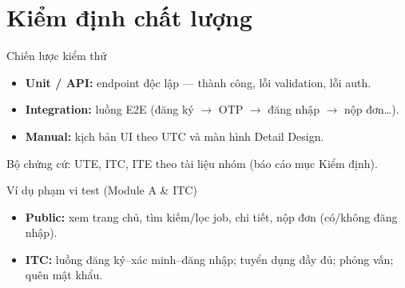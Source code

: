 \section{Kiểm định chất lượng}
\begin{frame}{Chiến lược kiểm thử}
  \small
  \begin{itemize}
    \item \textbf{Unit / API:} endpoint độc lập --- thành công, lỗi validation, lỗi auth.
    \item \textbf{Integration:} luồng E2E (đăng ký $\rightarrow$ OTP $\rightarrow$ đăng nhập $\rightarrow$ nộp đơn\dots).
    \item \textbf{Manual:} kịch bản UI theo UTC và màn hình Detail Design.
  \end{itemize}
  \vspace{0.35cm}
  {\footnotesize Bộ chứng cứ: UTE, ITC, ITE theo tài liệu nhóm (báo cáo mục Kiểm định).}
\end{frame}

\begin{frame}{Ví dụ phạm vi test (Module A \& ITC)}
  \footnotesize
  \begin{itemize}
    \item \textbf{Public:} xem trang chủ, tìm kiếm/lọc job, chi tiết, nộp đơn (có/không đăng nhập).
    \item \textbf{ITC:} luồng đăng ký--xác minh--đăng nhập; tuyển dụng đầy đủ; phỏng vấn; quên mật khẩu.
  \end{itemize}
\end{frame}

